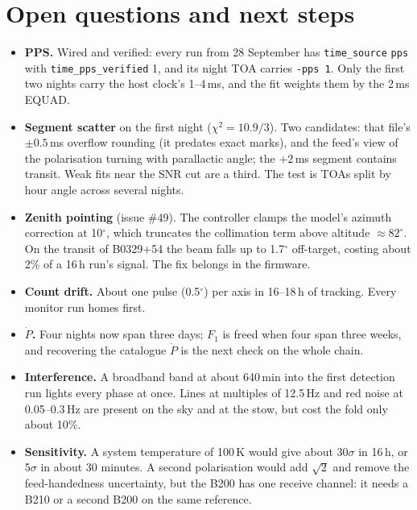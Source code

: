 \documentclass[11pt,a4paper]{article}
\newcommand{\code}[1]{\texttt{#1}}
\newcommand{\psr}{B0329+54}
\begin{document}
\section{Open questions and next steps}
\begin{itemize}
\item \textbf{PPS.} Wired and verified: every run from 28 September has \code{time\_source} \code{pps} with \code{time\_pps\_verified} 1, and its night TOA carries \code{-pps 1}. Only the first two nights carry the host clock's 1--4\,ms, and the fit weights them by the 2\,ms EQUAD.
\item \textbf{Segment scatter} on the first night ($\chi^2 = 10.9/3$). Two candidates: that file's $\pm0.5$\,ms overflow rounding (it predates exact marks), and the feed's view of the polarisation turning with parallactic angle; the $+2$\,ms segment contains transit. Weak fits near the SNR cut are a third. The test is TOAs split by hour angle across several nights.
\item \textbf{Zenith pointing} (issue \#49). The controller clamps the model's azimuth correction at 10$^\circ$, which truncates the collimation term above altitude $\approx82^\circ$. On the transit of \psr{} the beam falls up to 1.7$^\circ$ off-target, costing about 2\% of a 16\,h run's signal. The fix belongs in the firmware.
\item \textbf{Count drift.} About one pulse (0.5$^\circ$) per axis in 16--18\,h of tracking. Every monitor run homes first.
\item \textbf{$\dot P$.} Four nights now span three days; $F_1$ is freed when four span three weeks, and recovering the catalogue $\dot P$ is the next check on the whole chain.
\item \textbf{Interference.} A broadband band at about 640\,min into the first detection run lights every phase at once. Lines at multiples of 12.5\,Hz and red noise at 0.05--0.3\,Hz are present on the sky and at the stow, but cost the fold only about 10\%.
\item \textbf{Sensitivity.} A system temperature of 100\,K would give about 30$\sigma$ in 16\,h, or 5$\sigma$ in about 30 minutes. A second polarisation would add $\sqrt2$ and remove the feed-handedness uncertainty, but the B200 has one receive channel: it needs a B210 or a second B200 on the same reference.
\end{itemize}

\end{document}
